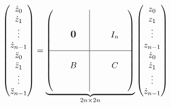 \begin{align} \label{eq:percussion1d4}
    \begin{pmatrix}
        \dot z_0 \\ \dot z_1 \\ \vdots \\ \dot z_{n-1} \\ \ddot z_0 \\ \ddot z_1 \\ \vdots \\ \ddot z_{n-1}
    \end{pmatrix}
    = 
    \underbrace{\begin{pmatrix}
        \begin{matrix}
       & & &  \\ & & &  \\ & & \bigzero & \\ & & & \\      
        \end{matrix}
        & \rvline 
        & \begin{matrix}
        & & & \\ & & &  \\ & & I_n & \\ & & & \\
        \end{matrix}  \\ 
        \hline
        \begin{matrix}
            & & &  \\ & & B & \\ & & & \\ & & & \\     
        \end{matrix}
        & \rvline 
        &\begin{matrix}
            & & & \\ & & C & \\ & & & \\ & & & \\        
        \end{matrix}
      \end{pmatrix}}_{2n \times 2n}
      \begin{pmatrix}
        z_0 \\ z_1 \\ \vdots \\ z_{n-1} \\ \dot z_0 \\ \dot z_1 \\ \vdots \\ \dot z_{n-1}

\end{pmatrix}
\end{align}

